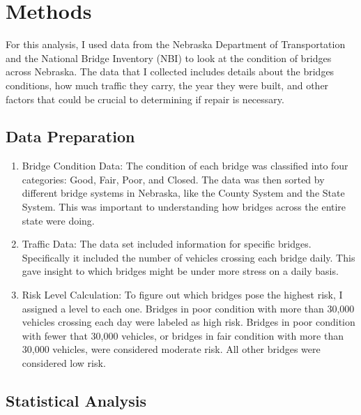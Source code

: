 \documentclass[
  letterpaper,
  DIV=11,
  numbers=noendperiod]{scrreprt}
\providecommand{\tightlist}{%
  \setlength{\itemsep}{0pt}\setlength{\parskip}{0pt}}\usepackage{longtable,booktabs,array}
\begin{document}

\chapter{Methods}\label{methods-1}

For this analysis, I used data from the Nebraska Department of
Transportation and the National Bridge Inventory (NBI) to look at the
condition of bridges across Nebraska. The data that I collected includes
details about the bridges conditions, how much traffic they carry, the
year they were built, and other factors that could be crucial to
determining if repair is necessary.

\section{Data Preparation}\label{data-preparation}

\begin{enumerate}
\def\labelenumi{\arabic{enumi}.}
\tightlist
\item
  Bridge Condition Data: The condition of each bridge was classified
  into four categories: Good, Fair, Poor, and Closed. The data was then
  sorted by different bridge systems in Nebraska, like the County System
  and the State System. This was important to understanding how bridges
  across the entire state were doing.
\item
  Traffic Data: The data set included information for specific bridges.
  Specifically it included the number of vehicles crossing each bridge
  daily. This gave insight to which bridges might be under more stress
  on a daily basis.
\item
  Risk Level Calculation: To figure out which bridges pose the highest
  risk, I assigned a level to each one. Bridges in poor condition with
  more than 30,000 vehicles crossing each day were labeled as high risk.
  Bridges in poor condition with fewer that 30,000 vehicles, or bridges
  in fair condition with more than 30,000 vehicles, were considered
  moderate risk. All other bridges were considered low risk.
\end{enumerate}

\section{Statistical Analysis}\label{statistical-analysis}
\end{document}
